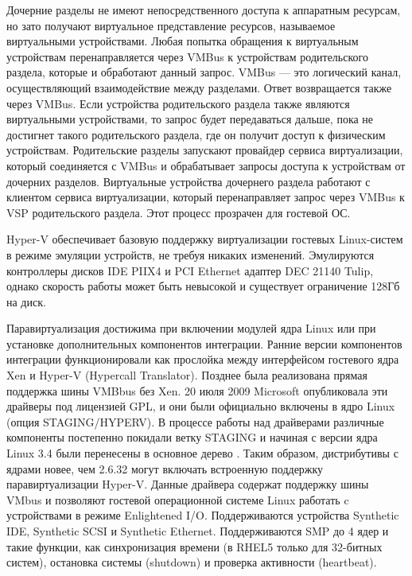 Дочерние разделы не имеют непосредственного доступа к аппаратным ресурсам, но зато получают виртуальное представление ресурсов, называемое виртуальными устройствами.
Любая попытка обращения к виртуальным устройствам перенаправляется через VMBus к устройствам родительского раздела, которые и обработают данный запрос.
VMBus --- это логический канал, осуществляющий взаимодействие между разделами.
Ответ возвращается также через VMBus.
Если устройства родительского раздела также являются виртуальными устройствами, то запрос будет передаваться дальше, пока не достигнет такого родительского раздела, где он получит доступ к физическим устройствам.
Родительские разделы запускают провайдер сервиса виртуализации, который соединяется с VMBus и обрабатывает запросы доступа к устройствам от дочерних разделов.
Виртуальные устройства дочернего раздела работают с клиентом сервиса виртуализации, который перенаправляет запрос через VMBus к VSP родительского раздела. Этот процесс прозрачен для гостевой ОС.

Hyper-V обеспечивает базовую поддержку виртуализации гостевых Linux-систем в режиме эмуляции устройств, не требуя никаких изменений.
Эмулируются контроллеры дисков IDE PIIX4 и PCI Ethernet адаптер DEC 21140 Tulip, однако скорость работы может быть невысокой и существует ограничение 128Гб на диск.

Паравиртуализация достижима при включении модулей ядра Linux или при установке дополнительных компонентов интеграции.
Ранние версии компонентов интеграции функционировали как прослойка между интерфейсом гостевого ядра Xen и Hyper-V (Hypercall Translator).
Позднее была реализована прямая поддержка шины VMBbus без Xen.
20 июля 2009 Microsoft опубликовала эти драйверы под лицензией GPL, и они были официально включены в ядро Linux (опция STAGING/HYPERV).
В процессе работы над драйверами различные компоненты постепенно покидали ветку STAGING и начиная с версии ядра Linux 3.4 были перенесены в основное дерево \cite{hyper-v}.
Таким образом, дистрибутивы с ядрами новее, чем 2.6.32 могут включать встроенную поддержку паравиртуализации Hyper-V.
Данные драйвера содержат поддержку шины VMbus и позволяют гостевой операционной системе Linux работать c устройствами в режиме Enlightened I/O.
Поддерживаются устройства Synthetic IDE, Synthetic SCSI и Synthetic Ethernet.
Поддерживаются SMP до 4 ядер и такие функции, как синхронизация времени (в RHEL5 только для 32-битных систем), остановка системы (shutdown) и проверка активности (heartbeat).


